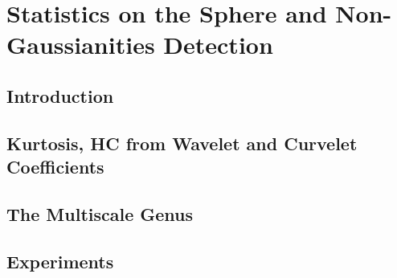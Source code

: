 \chapter{Statistics on the Sphere and Non-Gaussianities Detection}

\section{Introduction}

\section{Kurtosis, HC from Wavelet and Curvelet Coefficients}

\section{The Multiscale Genus}

\section{Experiments}
